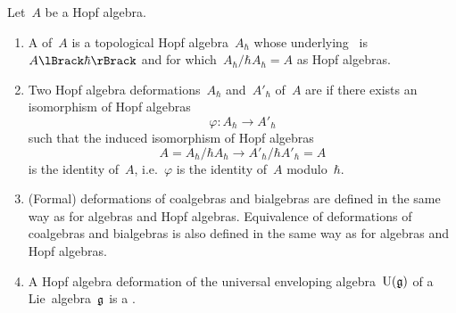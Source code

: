 \documentclass[a4paper, 11pt, oneside]{scrartcl}
\begin{document}
\begin{definition}
  Let~$A$ be a Hopf algebra.
  \begin{enumerate}
    \item
      A  of~$A$ is a topological Hopf algebra~$A_{\hbar}$ whose underlying~\module{$\kfhbar$} is~$\power{A}{\hbar}$ and for which~$A_\hbar / \hbar A_\hbar = A$ as Hopf algebras.
    \item
      Two Hopf algebra deformations~$A_\hbar$ and~$A'_\hbar$ of~$A$ are  if there exists an isomorphism of Hopf algebras
      \[
        \varphi
        \colon
        A_\hbar
        \to
        A'_\hbar
      \]
      such that the induced isomorphism of Hopf algebras
      \[
        A
        =
        A_\hbar / \hbar A_\hbar
        \to
        A'_\hbar / \hbar A'_\hbar
        = A
      \]
      is the identity of~$A$, i.e.~$\varphi$ is the identity of~$A$ modulo~$\hbar$.
    \item
      (Formal) deformations of coalgebras and bialgebras are defined in the same way as for algebras and Hopf algebras.
      Equivalence of deformations of coalgebras and bialgebras is also defined in the same way as for algebras and Hopf algebras.
    \item
      A Hopf algebra deformation of the universal enveloping algebra~$\operatorname{U}(\mathfrak{g})$ of a Lie~algebra~$\mathfrak{g}$ is a .
  \end{enumerate}
\end{definition}
\end{document}
